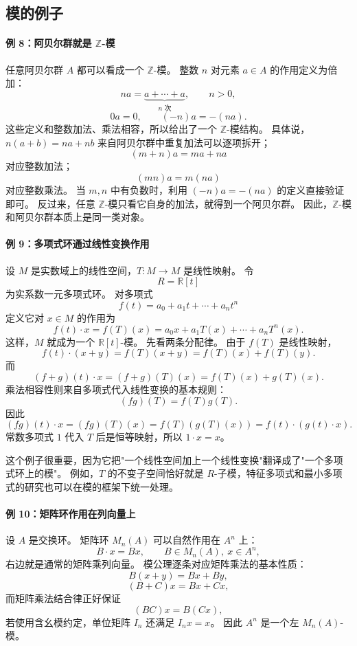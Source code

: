 \subsection{模的例子}\label{sec:module-examples}

\paragraph*{例 8：阿贝尔群就是 $\mathbb Z$-模}
任意阿贝尔群 $A$ 都可以看成一个 $\mathbb Z$-模。
整数 $n$ 对元素 $a\in A$ 的作用定义为倍加：
\[
na=\underbrace{a+\cdots+a}_{n\text{ 次}},\qquad n>0,
\]
\[
0a=0,\qquad (-n)a=-(na).
\]
这些定义和整数加法、乘法相容，所以给出了一个 $\mathbb Z$-模结构。
具体说，$n(a+b)=na+nb$ 来自阿贝尔群中重复加法可以逐项拆开；
\[
(m+n)a=ma+na
\]
对应整数加法；
\[
(mn)a=m(na)
\]
对应整数乘法。
当 $m,n$ 中有负数时，利用 $(-n)a=-(na)$ 的定义直接验证即可。
反过来，任意 $\mathbb Z$-模只看它自身的加法，就得到一个阿贝尔群。
因此，$\mathbb Z$-模和阿贝尔群本质上是同一类对象。

\paragraph*{例 9：多项式环通过线性变换作用}
设 $M$ 是实数域上的线性空间，$T:M\to M$ 是线性映射。
令
\[
R=\mathbb R[t]
\]
为实系数一元多项式环。
对多项式
\[
f(t)=a_0+a_1t+\cdots+a_nt^n
\]
定义它对 $x\in M$ 的作用为
\[
f(t)\cdot x=f(T)(x)
=a_0x+a_1T(x)+\cdots+a_nT^n(x).
\]
这样，$M$ 就成为一个 $\mathbb R[t]$-模。
先看两条分配律。
由于 $f(T)$ 是线性映射，
\[
f(t)\cdot(x+y)=f(T)(x+y)=f(T)(x)+f(T)(y).
\]
而
\[
(f+g)(t)\cdot x=(f+g)(T)(x)=f(T)(x)+g(T)(x).
\]
乘法相容性则来自多项式代入线性变换的基本规则：
\[
(fg)(T)=f(T)g(T).
\]
因此
\[
(fg)(t)\cdot x=(fg)(T)(x)=f(T)(g(T)(x))=f(t)\cdot(g(t)\cdot x).
\]
常数多项式 $1$ 代入 $T$ 后是恒等映射，所以 $1\cdot x=x$。

这个例子很重要，因为它把"一个线性空间加上一个线性变换"翻译成了"一个多项式环上的模"。
例如，$T$ 的不变子空间恰好就是 $R$-子模，特征多项式和最小多项式的研究也可以在模的框架下统一处理。

\paragraph*{例 10：矩阵环作用在列向量上}
设 $A$ 是交换环。
矩阵环 $M_n(A)$ 可以自然作用在 $A^n$ 上：
\[
B\cdot x=Bx,\qquad B\in M_n(A),\ x\in A^n,
\]
右边就是通常的矩阵乘列向量。
模公理逐条对应矩阵乘法的基本性质：
\[
B(x+y)=Bx+By,
\]
\[
(B+C)x=Bx+Cx,
\]
而矩阵乘法结合律正好保证
\[
(BC)x=B(Cx),
\]
若使用含幺模约定，单位矩阵 $I_n$ 还满足 $I_nx=x$。
因此 $A^n$ 是一个左 $M_n(A)$-模。

